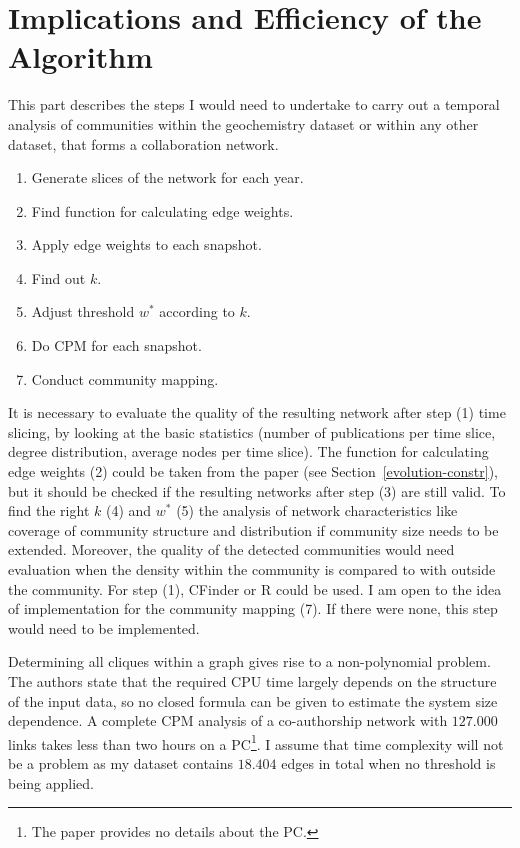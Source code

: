 \documentclass[runningheads,a4paper]{llncs}
\begin{document}
\section{Implications and Efficiency of the Algorithm}
This part describes the steps I would need to undertake to carry out a temporal analysis of communities within the geochemistry dataset or within any other dataset, that forms a collaboration network.

\medskip

\noindent
\colorbox{usethiscolorhere}{
\begin{minipage}{\dimexpr\textwidth-2\fboxsep}

\begin{enumerate}
\small
	\item[(1)] Generate slices of the network for each year.
	\item[(2)] Find function for calculating edge weights.
	\item[(3)] Apply edge weights to each snapshot.
	\item[(4)] Find out $k$.
	\item[(5)] Adjust threshold $w^*$ according to $k$.	
	\item[(6)] Do CPM for each snapshot.
	\item[(7)] Conduct community mapping.
\end{enumerate}

\end{minipage}
}

\medskip

It is necessary to evaluate the quality of the resulting network after step (1) time slicing, by looking at the basic statistics (number of publications per time slice, degree distribution, average nodes per time slice).
The function for calculating edge weights (2) could be taken from the paper (see Section~\ref{evolution-constr}), but it should be checked if the resulting networks after step (3) are still valid.
To find the right $k$ (4) and $w^*$ (5) the analysis of network characteristics like coverage of community structure and distribution if community size needs to be extended.
Moreover, the quality of the detected communities would need evaluation when the density within the community is compared to with outside the community.
For step (1), CFinder or R could be used.
I am open to the idea of implementation for the community mapping (7). If there were none, this step would need to be implemented.

Determining all cliques within a graph gives rise to a non-polynomial problem.
The authors state that the required CPU time largely depends on the structure of the input data, so no closed formula can be given to estimate the system size dependence.
A complete CPM analysis of a co-authorship network with $127.000$ links takes less than two hours on a PC\footnote{The paper provides no details about the PC.}.
I assume that time complexity will not be a problem as my dataset contains $18.404$ edges in total when no threshold is being applied.
\end{document}
